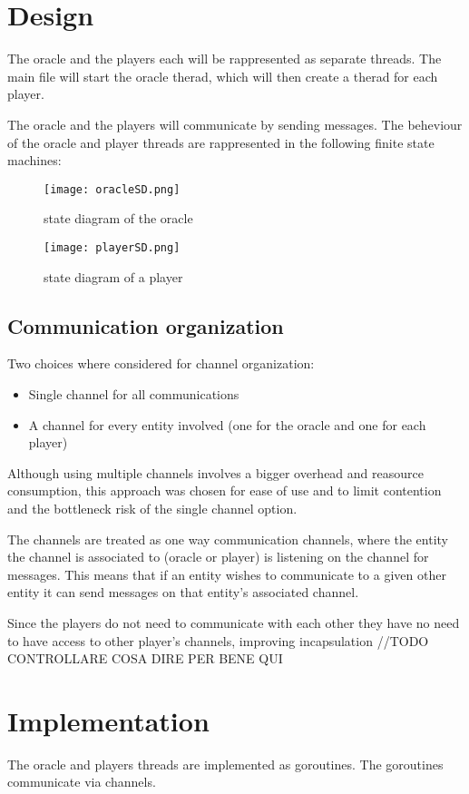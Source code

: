\documentclass[12pt, a4paper]{report}
\begin{document}
\chapter{Design}
The oracle and the players each will be rappresented as separate threads. The main file will start the oracle therad, which will then create a therad for each player.

The oracle and the players will communicate by sending messages. The beheviour of the oracle and player threads are rappresented in the following finite state machines:

\begin{figure}
    \centering
    \texttt{[image: oracleSD.png]}
    \caption{state diagram of the oracle}\label{fig:oracleSD}
\end{figure}

\begin{figure}
    \centering
    \texttt{[image: playerSD.png]}
    \caption{state diagram of a player}\label{fig:playerSD}
\end{figure}

\section{Communication organization}
Two choices where considered for channel organization:
\begin{itemize}
    \item Single channel for all communications
    \item A channel for every entity involved (one for the oracle and one for each player)
\end{itemize}

\newpage

Although using multiple channels involves a bigger overhead and reasource consumption, this approach was chosen for ease of use and to limit contention and
 the bottleneck risk of the single channel option.

The channels are treated as one way communication channels, where the entity the channel is associated to (oracle or player) is listening on the channel for messages.
 This means that if an entity wishes to communicate to a given other entity it can send messages on that entity's associated channel.

Since the players do not need to communicate with each other they have no need to have access to other player's channels, improving incapsulation //TODO CONTROLLARE COSA DIRE PER BENE QUI
\chapter{Implementation}
The oracle and players threads are implemented as goroutines. The goroutines communicate via channels.
\end{document}
